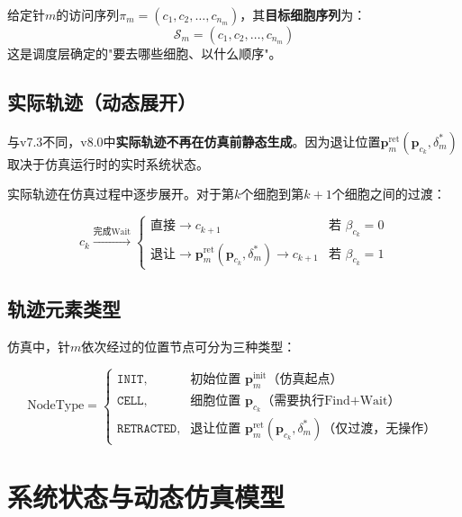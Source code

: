 \documentclass[11pt,a4paper]{article}
\begin{document}
给定针$m$的访问序列$\pi_m = (c_1, c_2, \ldots, c_{n_m})$，其\textbf{目标细胞序列}为：
\begin{equation}
    \mathcal{S}_m = (c_1, c_2, \ldots, c_{n_m})
\end{equation}
这是调度层确定的"要去哪些细胞、以什么顺序"。

\subsection{实际轨迹（动态展开）}

与v7.3不同，v8.0中\textbf{实际轨迹不再在仿真前静态生成}。因为退让位置$\mathbf{p}_m^{\text{ret}}(\mathbf{p}_{c_k}, \delta_m^*)$取决于仿真运行时的实时系统状态。

实际轨迹在仿真过程中逐步展开。对于第$k$个细胞到第$k+1$个细胞之间的过渡：

\begin{equation}
    c_k \xrightarrow{\text{完成Wait}} \begin{cases}
    \text{直接} \longrightarrow c_{k+1} & \text{若 } \beta_{c_k} = 0 \\[8pt]
    \text{退让} \longrightarrow \mathbf{p}_m^{\text{ret}}(\mathbf{p}_{c_k}, \delta_m^*) \longrightarrow c_{k+1} & \text{若 } \beta_{c_k} = 1
    \end{cases}
\end{equation}

\subsection{轨迹元素类型}

仿真中，针$m$依次经过的位置节点可分为三种类型：

\begin{equation}
    \text{NodeType} = \begin{cases}
    \texttt{INIT}, & \text{初始位置 } \mathbf{p}_m^{\text{init}} \text{（仿真起点）} \\
    \texttt{CELL}, & \text{细胞位置 } \mathbf{p}_{c_k} \text{（需要执行Find+Wait）} \\
    \texttt{RETRACTED}, & \text{退让位置 } \mathbf{p}_m^{\text{ret}}(\mathbf{p}_{c_k}, \delta_m^*) \text{（仅过渡，无操作）}
    \end{cases}
\end{equation}

\section{系统状态与动态仿真模型} \label{sec:state}
\end{document}
